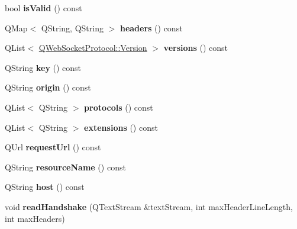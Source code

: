 \begin{DoxyCompactItemize}
bool {\bfseries is\+Valid} () const
\item 
\mbox{\label{class_q_web_socket_handshake_request_a8a2275391b8aca8e7edc41e3375c4918}} 
Q\+Map$<$ Q\+String, Q\+String $>$ {\bfseries headers} () const
\item 
\mbox{\label{class_q_web_socket_handshake_request_abdddc5bea96a5d02387c5fbec3f296c4}} 
Q\+List$<$ \mbox{\hyperlink{namespace_q_web_socket_protocol_ad53f2684577effe0a517eadb48714df3}{Q\+Web\+Socket\+Protocol\+::\+Version}} $>$ {\bfseries versions} () const
\item 
\mbox{\label{class_q_web_socket_handshake_request_a013aa576aaccf33f5c9e63962f1a8b5d}} 
Q\+String {\bfseries key} () const
\item 
\mbox{\label{class_q_web_socket_handshake_request_aae993396a8225200fe71af8d9899e5fd}} 
Q\+String {\bfseries origin} () const
\item 
\mbox{\label{class_q_web_socket_handshake_request_af012d07a491c8481469b2ea004617fe2}} 
Q\+List$<$ Q\+String $>$ {\bfseries protocols} () const
\item 
\mbox{\label{class_q_web_socket_handshake_request_af0d87f6e0a5ad0deedfb426c10fb0c4d}} 
Q\+List$<$ Q\+String $>$ {\bfseries extensions} () const
\item 
\mbox{\label{class_q_web_socket_handshake_request_ace75f988bb103d9690b9e15fef9b665f}} 
Q\+Url {\bfseries request\+Url} () const
\item 
\mbox{\label{class_q_web_socket_handshake_request_a1f4bc44e5390000a9037d40cdb99358b}} 
Q\+String {\bfseries resource\+Name} () const
\item 
\mbox{\label{class_q_web_socket_handshake_request_a22117a1f085bf012cd67c5589b6d2b39}} 
Q\+String {\bfseries host} () const
\item 
\mbox{\label{class_q_web_socket_handshake_request_a80ae598579208facddc8cf44d7e55371}} 
void {\bfseries read\+Handshake} (Q\+Text\+Stream \&text\+Stream, int max\+Header\+Line\+Length, int max\+Headers)
\end{DoxyCompactItemize}


